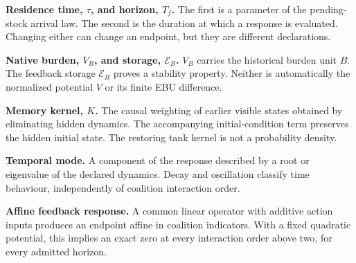 \textbf{Residence time, $\tau$, and horizon, $T_f$.} The first is a parameter of the pending-stock arrival law. The second is the duration at which a response is evaluated. Changing either can change an endpoint, but they are different declarations.

\textbf{Native burden, $V_B$, and storage, $\mathcal E_B$.} $V_B$ carries the historical burden unit $B$. The feedback storage $\mathcal E_B$ proves a stability property. Neither is automatically the normalized potential $V$ or its finite EBU difference.

\textbf{Memory kernel, $K$.} The causal weighting of earlier visible states obtained by eliminating hidden dynamics. The accompanying initial-condition term preserves the hidden initial state. The restoring tank kernel is not a probability density.

\textbf{Temporal mode.} A component of the response described by a root or eigenvalue of the declared dynamics. Decay and oscillation classify time behaviour, independently of coalition interaction order.

\textbf{Affine feedback response.} A common linear operator with additive action inputs produces an endpoint affine in coalition indicators. With a fixed quadratic potential, this implies an exact zero at every interaction order above two, for every admitted horizon.

